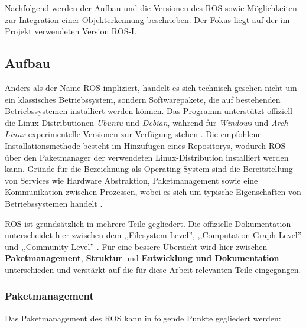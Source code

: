 Nachfolgend werden der Aufbau und die Versionen des \ac{ROS} sowie Möglichkeiten zur Integration einer Objekterkennung beschrieben. Der Fokus liegt auf der im Projekt verwendeten Version ROS-I.

\subsection{Aufbau}

Anders als der Name \ac{ROS} impliziert, handelt es sich technisch gesehen nicht um ein klassisches Betriebssystem, sondern Softwarepakete, die auf bestehenden Betriebssystemen installiert werden können. Das Programm unterstützt offiziell die Linux-Distributionen \textit{Ubuntu} und \textit{Debian}, während für \textit{Windows} und \textit{Arch Linux} experimentelle Versionen zur Verfügung stehen \cite{wikirosorg_noeticinstallation_2020}. Die empfohlene Installationsmethode besteht im Hinzufügen eines Repositorys, wodurch \ac{ROS} über den Paketmanager der verwendeten Linux-Distribution installiert werden kann. Gründe für die Bezeichnung als Operating System sind die Bereitstellung von Services wie Hardware Abstraktion, Paketmanagement sowie eine Kommunikation zwischen Prozessen, wobei es sich um typische Eigenschaften von Betriebssystemen handelt \cite[Absatz~1]{dattalo_rosintroduction_2018}.

\ac{ROS} ist grundsätzlich in mehrere Teile gegliedert. Die offizielle Dokumentation unterscheidet hier zwischen dem ,,Filesystem Level'', ,,Computation Graph Level'' und ,,Community Level'' \cite{romero_rosconcepts_2014}. Für eine bessere Übersicht wird hier zwischen \textbf{Paketmanagement}, \textbf{Struktur} und \textbf{Entwicklung und Dokumentation} unterschieden und verstärkt auf die für diese Arbeit relevanten Teile eingegangen.

\subsubsection{Paketmanagement}

Das Paketmanagement des \ac{ROS} kann in folgende Punkte gegliedert werden:

